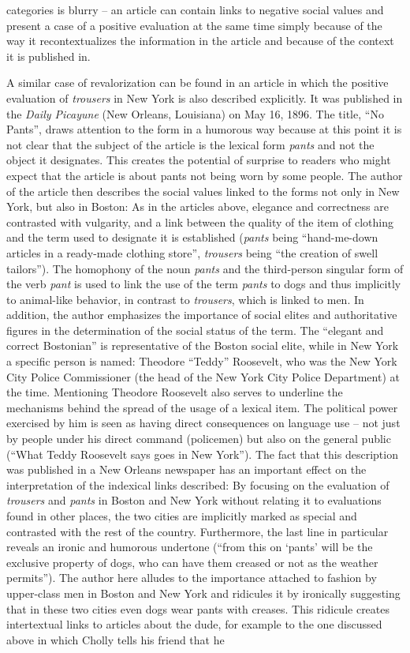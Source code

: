 categories is blurry – an article can contain links to negative social values and present a case of a positive evaluation at the same time simply because of the way it recontextualizes the information in the article and because of the context it is published in.

A similar case of revalorization can be found in an article in which the positive evaluation of \emph{trousers} in New York is also described explicitly. It was published in the \emph{Daily Picayune} (New Orleans, Louisiana) on May 16, 1896. The title, “No Pants”, draws attention to the form in a humorous way because at this point it is not clear that the subject of the article is the lexical form \emph{pants} and not the object it designates. This creates the potential of surprise to readers who might expect that the article is about pants not being worn by some people. The author of the article then describes the social values linked to the forms not only in New York, but also in Boston: As in the articles above, elegance and correctness are contrasted with vulgarity, and a link between the quality of the item of clothing and the term used to designate it is established (\emph{pants} being “hand-me-down articles in a ready-made clothing store”, \emph{trousers} being “the creation of swell tailors”). The homophony of the noun \emph{pants} and the third-person singular form of the verb \emph{pant} is used to link the use of the term \emph{pants} to dogs and thus implicitly to animal-like behavior, in contrast to \emph{trousers}, which is linked to men. In addition, the author emphasizes the importance of social elites and authoritative figures in the determination of the social status of the term. The “elegant and correct Bostonian” is representative of the Boston social elite, while in New York a specific person is named: Theodore “Teddy” Roosevelt, who was the New York City Police Commissioner (the head of the New York City Police Department) at the time. Mentioning Theodore Roosevelt also serves to underline the mechanisms behind the spread of the usage of a lexical item. The political power exercised by him is seen as having direct consequences on language use – not just by people under his direct command (policemen) but also on the general public (“What Teddy Roosevelt says goes in New York”). The fact that this description was published in a New Orleans newspaper has an important effect on the interpretation of the indexical links described: By focusing on the evaluation of \emph{trousers} and \emph{pants} in Boston and New York without relating it to evaluations found in other places, the two cities are implicitly marked as special and contrasted with the rest of the country. Furthermore, the last line in particular reveals an ironic and humorous undertone (“from this on ‘pants’ will be the exclusive property of dogs, who can have them creased or not as the weather permits”). The author here alludes to the importance attached to fashion by upper-class men in Boston and New York and ridicules it by ironically suggesting that in these two cities even dogs wear pants with creases. This ridicule creates intertextual links to articles about the dude, for example to the one discussed above in which Cholly tells his friend that he 